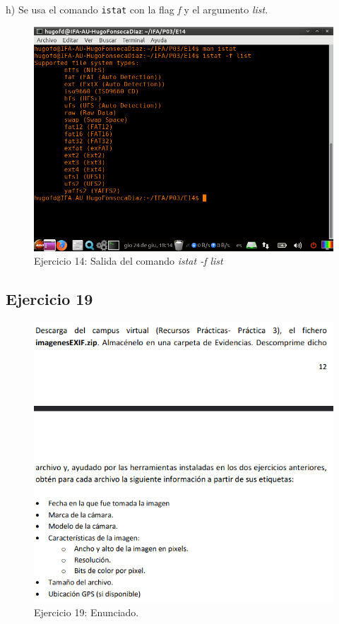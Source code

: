 \documentclass[11pt]{article}
\begin{document}
h) Se usa el comando \verb|istat| con la flag \textit{f} y el argumento \textit{list}.

\begin{figure}[H]
    \caption{Ejercicio 14: Salida del comando \textit{istat -f list}}
    \centering
    \includegraphics[scale=0.7]{p03/e14-7.png}
\end{figure}

\subsection{Ejercicio 19}

\begin{figure}[H]
    \caption{Ejercicio 19: Enunciado.}
  \centering
  \includegraphics[scale=0.7]{other/enunciado_p03_e19.png}
\end{figure}
\end{document}
